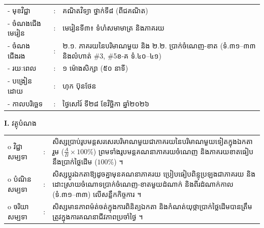 \documentclass[a4paper,10pt]{article}
\newcommand{\wcirc}{{\CourierBullet\fontsize{9.5pt}{11pt}\selectfont o}}
\begin{document}
{\renewcommand{\arraystretch}{0.98}
\hspace*{3.1cm}%
\begin{tabular}{@{}l l L{11.0cm}@{}}
  - \hspace{0.35cm} មុខវិជ្ជា & : & គណិតវិទ្យា ថ្នាក់ទី៨ (ពីជគណិត) \\
  - \hspace{0.35cm} ចំណងជើងមេរៀន & : & មេរៀនទី៣៖ ទំហំសមាមាត្រ និងភាគរយ \\
  - \hspace{0.35cm} ចំណងជើងរង & : & ២.១. ភាគរយនៃបរិមាណមួយ និង ២.២. ប្រាក់ចំណេញ-ខាត (ទំ.៣១–៣៣ និងលំហាត់ \#3, \#5ខ-គ ទំ.៤០–៤១) \\
  - \hspace{0.35cm} រយៈពេល & : & ១ ម៉ោងសិក្សា (៥០ នាទី) \\
  - \hspace{0.35cm} បង្រៀនដោយ & : & ហុក ប៊ុនថែន \\
  - \hspace{0.35cm} កាលបរិច្ឆេទ & : & ថ្ងៃសៅរ៍ ទី២៨ ខែវិច្ឆិកា ឆ្នាំ២០២៦ \\
\end{tabular}

\vspace{2pt}

\textbf{I.} {\muol វត្ថុបំណង}\\[1pt]
\hspace*{0.55cm}%
\begin{tabular}{@{}l l L{14.2cm}@{}}
  \wcirc \hspace{0.25cm} វិជ្ជាសម្បទា & : & សិស្សប្រាប់រូបមន្តសរសេរបរិមាណមួយជាភាគរយនៃបរិមាណមួយទៀតក្នុងឯកតារួម ($\frac{A}{B}\times 100\%$) ព្រមទាំងរូបមន្តគណនាភាគរយចំណេញ និងភាគរយខាតធៀបនឹងប្រាក់ថ្លៃដើម ($100\%$) ។ \\
  \wcirc \hspace{0.25cm} បំណិនសម្បទា & : & សិស្សប្ដូរឯកតាឱ្យដូចគ្នាមុនគណនាភាគរយ ប្រៀបធៀបពិន្ទុប្រឡងជាភាគរយ និងដោះស្រាយចំណោទប្រាក់ចំណេញ-ខាតមួយដំណាក់ និងពីរដំណាក់កាល (ទំ.៣១–៣៣) លើសន្លឹកកិច្ចការ ។ \\
  \wcirc \hspace{0.25cm} ចរិយាសម្បទា & : & សិស្សមានភាពម៉ត់ចត់ក្នុងការពិនិត្យឯកតា និងកំណត់យុថ្កាប្រាក់ថ្លៃដើមបានត្រឹមត្រូវក្នុងការគណនាជីវភាពប្រចាំថ្ងៃ ។ \\
\end{tabular}

\vspace{2pt}

}
\end{document}
